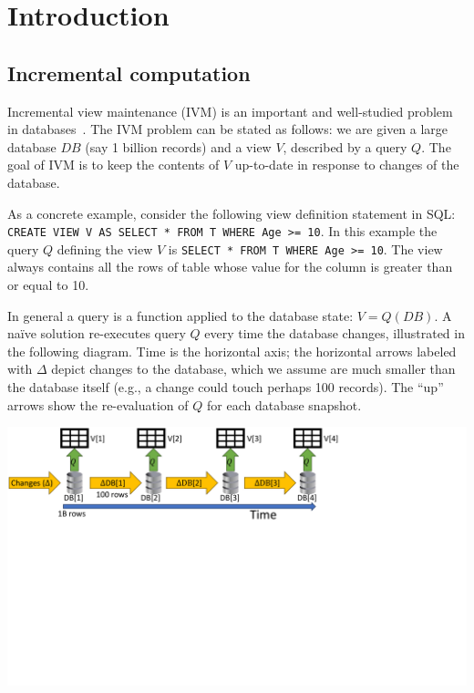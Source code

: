 \section{Introduction}\label{sec:introduction}

\subsection{Incremental computation}\label{sec:intro-incremental}

Incremental view maintenance (IVM) is an important and well-studied
problem in databases~\cite{gupta-idb95}.  The IVM problem can be
stated as follows: we are given a large database $DB$ (say 1 billion
records) and a view $V$, described by a query $Q$.  The goal of IVM is
to keep the contents of $V$ up-to-date in response to changes of the
database.

As a concrete example, consider the following view definition
statement in SQL: \texttt{CREATE VIEW V AS SELECT * FROM T WHERE Age
  >= 10}.  In this example the query $Q$ defining the view $V$ is
\texttt{SELECT * FROM T WHERE Age >= 10}.  The view  always
contains all the rows of table  whose value for the column
 is greater than or equal to 10.

In general a query is a function applied to the database state: $V =
Q(DB)$.  A na\"ive solution re-executes query $Q$ every time the
database changes, illustrated in the following diagram.  Time is the
horizontal axis; the horizontal arrows labeled with $\Delta$ depict
changes to the database, which we assume are much smaller than the
database itself (e.g., a change could touch perhaps 100 records).  The
``up'' arrows show the re-evaluation of $Q$ for each database
snapshot.

\includegraphics[trim={0 4.8in 3.7in 0},clip,scale=.30]{view.pdf}

